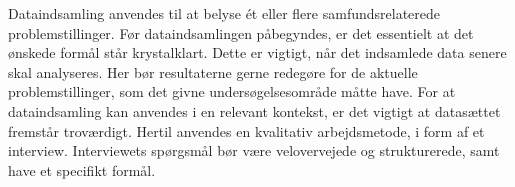 
\label{sec:dataindsamling}
Dataindsamling anvendes til at belyse ét eller flere samfundsrelaterede problemstillinger. Før dataindsamlingen påbegyndes, er det essentielt at det ønskede formål står krystalklart. Dette er vigtigt, når det indsamlede data senere skal analyseres. Her bør resultaterne gerne redegøre for de aktuelle problemstillinger, som det givne undersøgelsesområde måtte have. For at dataindsamling kan anvendes i en relevant kontekst, er det vigtigt at datasættet fremstår troværdigt. Hertil anvendes en kvalitativ arbejdsmetode, i form af et interview. Interviewets spørgsmål bør være velovervejede og strukturerede, samt have et specifikt formål.\\